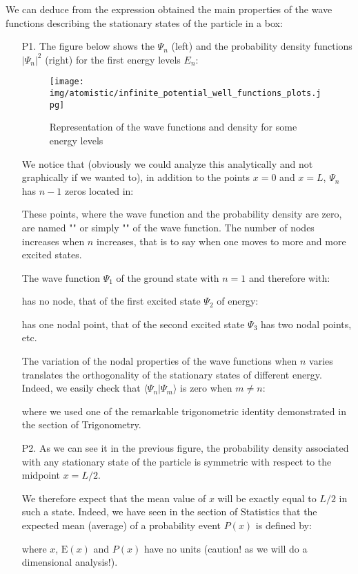 	We can deduce from the expression obtained the main properties of the wave functions describing the stationary states of the particle in a box:
	\begin{enumerate}
		\item[P1.] The figure below shows the $\Psi_n$ (left) and the probability density functions $|\Psi_n|^2$ (right) for the first energy levels $E_n$:
		\begin{figure}[H]
			\centering
			\texttt{[image: img/atomistic/infinite\_potential\_well\_functions\_plots.jpg]}	
			\caption[]{Representation of the wave functions and density for some energy levels}
		\end{figure}
		We notice that (obviously we could analyze this analytically and not graphically if we wanted to), in addition to the points $x=0$ and $x=L$, $\Psi_n$ has $n-1$ zeros located in:
		
		These points, where the wave function and the probability density are zero, are named "" or simply "" of the wave function. The number of nodes increases when $n$ increases, that is to say when one moves to more and more excited states. 

		The wave function $\Psi_1$ of the ground state with $n = 1$ and therefore with:
		
		has no node, that of the first excited state $\Psi_2$ of energy:
		
		has one nodal point, that of the second excited state $\Psi_3$ has two nodal points, etc.
		
		The variation of the nodal properties of the wave functions when $n$ varies translates the orthogonality of the stationary states of different energy. Indeed, we easily check that $\langle \Psi_n|\Psi_m\rangle$ is zero when $m\neq n$:
		
		where we used one of the remarkable trigonometric identity demonstrated in the section of Trigonometry.
		
		\item[P2.] As we can see it in the previous figure, the probability density associated with any stationary state of the particle is symmetric with respect to the midpoint $x=L/2$.

		We therefore expect that the mean value of $x$ will be exactly equal to $L/2$ in such a state. Indeed, we have seen in the section of Statistics that the expected mean (average) of a probability event $P(x)$ is defined by:
		
		where $x$, $\text{E}(x)$ and $P(x)$ have no units (caution! as we will do a dimensional analysis!).


\end{enumerate}
